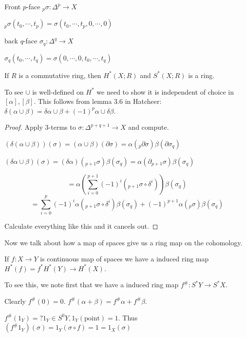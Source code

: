 \documentclass{article}
\theoremstyle{definition}
\begin{document}
    Front \(p\)-face \(_p \sigma: \Delta^p \to X\) 

    \(_p \sigma(t_0, \cdots , t_p) = \sigma(t_0, \cdots , t_p, 0, \cdots, 0)\)

    back \(q\)-face \(\sigma_q: \Delta^q \to X\)
    
    \(\sigma_q(t_0, \cdots , t_q) = \sigma(0, \cdots , 0, t_0, \cdots , t_q)\)

    If \(R\) is a commutative ring, then \(H^{\ast} (X;R)\) and \(S^{\ast} (X;R)\) is a ring.

    To see \(\cup\) is well-defined on \(H^{\ast}\) we need to show it is independent of choice in \([\alpha], [\beta]\). This follows from lemma 3.6 in Hatcheer: \(\delta(\alpha \cup \beta) = \delta \alpha \cup \beta + (-1)^p \alpha \cup \delta \beta\).

    \begin{proof}
        Apply \(3\)-terms to \(\sigma: \Delta^{p+q+1} \to X\) and compute.

        \((\delta(\alpha \cup \beta ))(\sigma) = (\alpha \cup \beta)(\partial \sigma) = \alpha(_p \partial \sigma) \beta(\partial \sigma_q)\) 

        \((\delta \alpha \cup \beta)(\sigma) = (\delta \alpha)(_{p+1}\sigma) \beta(\sigma_q)=\alpha(\partial _{p+1}\sigma) \beta(\sigma_q)\)
        
        \[
            = \alpha \left( \sum_{i=0}^{p+1} (-1)^i (_{p+1}\sigma \circ \delta^i) \right) \beta(\sigma_q)
        \]
        \[
            = \sum_{i=0}^p (-1)^i \alpha(_{p+1}\sigma \circ \delta^i) \beta(\sigma_q) + (-1)^{p+1} \alpha(_p \sigma) \beta(\sigma_q) 
        \]

        Calculate everything like this and it cancels out.
    \end{proof}

    Now we talk about how a map of spaces give us a ring map on the cohomology.

    If \(f: X\to Y\) is continuous map of spaces we have a induced ring map \(H^{\ast} (f)= f^{\ast} H^{\ast} (Y) \to H^{\ast} (X)\).

    To see this, we note first that we have a induced ring map \(f^\# : S^{\ast} Y \to S^{\ast} X\).

    Clearly \(f^\# (0) = 0\). \(f^\# (\alpha + \beta) = f^\# \alpha + f^\# \beta\).

    \(f^\# (1_Y) = ? 1_Y \in S^0 Y, 1_Y(\text{point}) = 1\). Thus \((f^\# 1_Y)(\sigma) = 1_Y(\sigma \circ f) = 1 = 1_X(\sigma)\)
    
\end{document}
